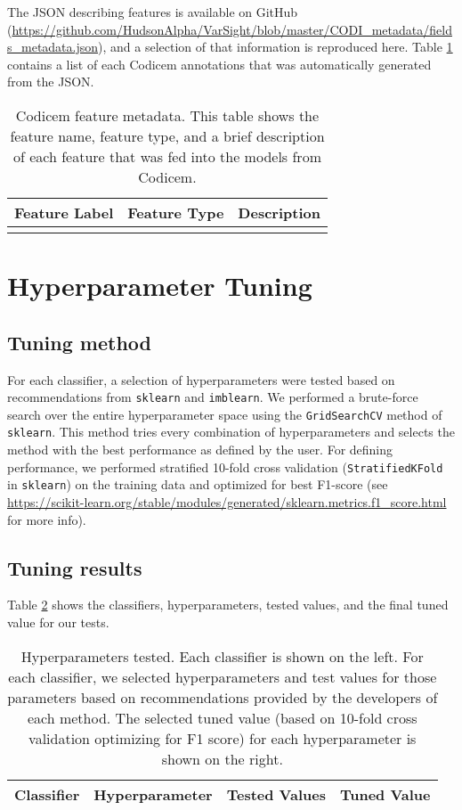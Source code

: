 \documentclass{article}
\begin{document}
The JSON describing features is available on GitHub (\url{https://github.com/HudsonAlpha/VarSight/blob/master/CODI_metadata/fields_metadata.json}), and a selection of that information is reproduced here.  Table \ref{tab:features} contains a list of each Codicem annotations that was automatically generated from the JSON.

\begin{longtable}{p{.20\linewidth}|p{.20\linewidth}|p{.50\linewidth}}
\textbf{Feature Label}&\textbf{Feature Type}&\textbf{Description} \\ \hline
\endhead

\caption{Codicem feature metadata.  This table shows the feature name, feature type, and a brief description of each feature that was fed into the models from Codicem.}
\label{tab:features}
\end{longtable}

\section{Hyperparameter Tuning}
\subsection{Tuning method}
For each classifier, a selection of hyperparameters were tested based on recommendations from \texttt{sklearn} and \texttt{imblearn}.  We performed a brute-force search over the entire hyperparameter space using the \texttt{GridSearchCV} method of \texttt{sklearn}.  This method tries every combination of hyperparameters and selects the method with the best performance as defined by the user.  For defining performance, we performed stratified 10-fold cross validation (\texttt{StratifiedKFold} in \texttt{sklearn}) on the training data and optimized for best F1-score (see \url{https://scikit-learn.org/stable/modules/generated/sklearn.metrics.f1_score.html} for more info).

\subsection{Tuning results}
Table \ref{tab:hyperparams} shows the classifiers, hyperparameters, tested values, and the final tuned value for our tests.

\begin{table}
\begin{tabular}{p{.3\linewidth}|p{.25\linewidth}|p{.2\linewidth}|p{.15\linewidth}}
\textbf{Classifier}&\textbf{Hyperparameter}&\textbf{Tested Values}&\textbf{Tuned Value} \\ \hline

\end{tabular}
\caption{Hyperparameters tested.  Each classifier is shown on the left.  For each classifier, we selected hyperparameters and test values for those parameters based on recommendations provided by the developers of each method.  The selected tuned value (based on 10-fold cross validation optimizing for F1 score) for each hyperparameter is shown on the right.}
\label{tab:hyperparams}
\end{table}
\end{document}
